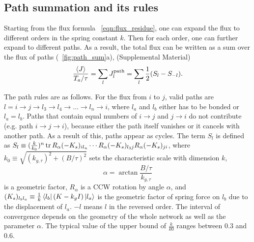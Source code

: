 \documentclass[
 preprint,
 preprintnumbers,
 amsmath,amssymb,
 aps,
 pre,
 longbibliography,
 superscriptaddress,
 10pt, twocolumn
]{revtex4-1}
\begin{document}

\subsection{Path summation and its rules}
Starting from the flux formula \eqnname~\eqref{eqn:flux_residue}, one can expand the flux to different orders in the spring constant $k$. Then for each order, one can further expand to different paths.
As a result, the total flux can be written as a sum over the flux of paths (\figurename~\ref{fig:path_sum}a), (Supplemental Material)
\begin{equation} \label{eqn:flux_path}
    \frac{\expval{J}}{T_a/\tau} = \sum_l J^\text{path}_l = \sum_l \frac{1}{2}(S_l - S_{-l}).
\end{equation}

The path rules are as follows.
For the flux from $i$ to $j$, valid paths are $l=i\rightarrow j\rightarrow l_3\rightarrow l_4\rightarrow \dots \rightarrow l_n\rightarrow i$, where $l_a$ and $l_b$ either has to be bonded or $l_a=l_b$. Paths that contain equal numbers of $i\rightarrow j$ and $j\rightarrow i$ do not contribute (e.g. path $i\rightarrow j\rightarrow i$), because either the path itself vanishes or it cancels with another path. As a result of this, paths appear as cycles.
The term $S_l$ is defined as $S_l \equiv (\frac{k}{k_0})^n \tr R_\alpha (-K_s)_{i l_n} \cdots R_\alpha (-K_s)_{l_3j} R_\alpha (-K_s)_{ji}$,
where $k_0\equiv \sqrt{(k_{g,\tau})^2 + (B/\tau)^2}$ sets the characteristic scale with dimension $k$, 
\begin{equation}
\label{eq:alphadefine}
\alpha = \arctan{\frac{B/\tau}{k_{g,\tau}}}
\end{equation}
is a geometric factor, $R_\alpha$ is a CCW rotation by angle $\alpha$, and $(K_s)_{l_b l_a} \equiv \frac{1}{k}\bra{l_b}(K-k_gI)\ket{l_a}$ is the geometric factor of spring force on $l_b$ due to the displacement of $l_a$.
$-l$ means $l$ in the reversed order.
The interval of convergence depends on the geometry of the whole network as well as the parameter $\alpha$. The typical value of the upper bound of $\frac{k}{k0}$ ranges between $0.3$ and $0.6$.
\end{document}
